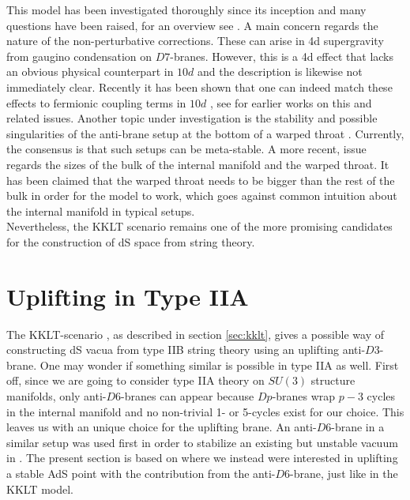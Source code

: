\documentclass[a4paper,12pt]{report}
\begin{document}
This model has been investigated thoroughly since its inception and many questions have been raised, for an overview see \cite{Andriot:2019wrs}. A main concern regards the nature of the non-perturbative corrections. These can arise in 4d supergravity from gaugino condensation on $D7$-branes. However, this is a 4d effect that lacks an obvious physical counterpart in $10d$ and the description is likewise not immediately clear. Recently it has been shown that one can indeed match these effects to fermionic coupling terms in $10d$ \cite{Kachru:2019dvo}, see \cite{Moritz:2017xto,Hamada:2018qef,Gautason:2018gln,Carta:2019rhx,Gautason:2019jwq,Hamada:2019ack,Bena:2019mte,Koerber:2007xk,Baumann:2010sx,Dymarsky:2010mf} for earlier works on this and related issues. Another topic under investigation is the stability and possible singularities of the anti-brane setup at the bottom of a warped throat \cite{Armas:2018rsy,Blaback:2012nf,Bena:2009xk,Bena:2012tx,McGuirk:2009xx,Dymarsky:2011pm,Polchinski:2000uf,Blaback:2019ucp,Danielsson:2016cit,Bena:2013hr,Blaback:2014tfa,Polchinski:2015bea,Cohen-Maldonado:2015ssa,Gautason:2015tla,Kuperstein:2014zda,Danielsson:2014yga}. Currently, the consensus is that such setups can be meta-stable. A more recent, issue regards the sizes of the bulk of the internal manifold and the warped throat. It has been claimed \cite{Gao:2020xqh} that the warped throat needs to be bigger than the rest of the bulk in order for the model to work, which goes against common intuition about the internal manifold in typical setups.\\
Nevertheless, the KKLT scenario remains one of the more promising candidates for the construction of dS space from string theory.

\section{Uplifting in Type  IIA}
\label{sec:IIAuplift}
The KKLT-scenario \cite{Kachru:2003aw,Kachru:2003sx}, as described in section \ref{sec:kklt}, gives a possible way of constructing dS vacua from type IIB string theory using an uplifting anti-$D3$-brane. One may wonder if something similar is possible in type IIA as well. First off, since we are going to consider type IIA theory on $SU(3)$ structure manifolds, only anti-$D6$-branes can appear because $Dp$-branes wrap $p-3$ cycles in the internal manifold and no non-trivial 1- or 5-cycles exist for our choice. This leaves us with an unique choice for the uplifting brane. An anti-$D6$-brane in a similar setup was used first in order to stabilize an existing but unstable vacuum in \cite{Kallosh:2018nrk}. The present section is based on \cite{Cribiori:2019bfx} where we instead were interested in uplifting a stable AdS point with the contribution from the anti-$D6$-brane, just like in the KKLT model.
\end{document}
